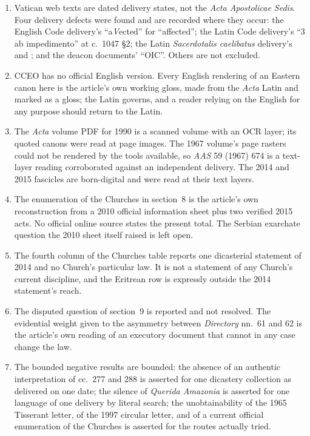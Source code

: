 \begin{enumerate}[leftmargin=1.45em,itemsep=0.25em]
\item Vatican web texts are dated delivery states, not the \emph{Acta Apostolicae Sedis}. Four delivery defects were found and are recorded where they occur: the English Code delivery's ``a\emph{V}ected'' for ``affected''; the Latin Code delivery's ``3 ab impedimento'' at c.~1047 §2; the Latin \emph{Sacerdotalis caelibatus} delivery's  and ; and the deacon documents' ``OIC''. Others are not excluded.
\item CCEO has no official English version. Every English rendering of an Eastern canon here is the article's own working gloss, made from the \emph{Acta} Latin and marked as a gloss; the Latin governs, and a reader relying on the English for any purpose should return to the Latin.
\item The \emph{Acta} volume PDF for 1990 is a scanned volume with an OCR layer; its quoted canons were read at page images. The 1967 volume's page rasters could not be rendered by the tools available, so \emph{AAS} 59 (1967) 674 is a text-layer reading corroborated against an independent delivery. The 2014 and 2015 fascicles are born-digital and were read at their text layers.
\item The enumeration of the Churches  in section~8 is the article's own reconstruction from a 2010 official information sheet plus two verified 2015 acts. No official online source states the present total. The Serbian exarchate question the 2010 sheet itself raised is left open.
\item The fourth column of the Churches table reports one dicasterial statement of 2014 and no Church's particular law. It is not a statement of any Church's current discipline, and the Eritrean row is expressly outside the 2014 statement's reach.
\item The disputed question of section~9 is reported and not resolved. The evidential weight given to the asymmetry between \emph{Directory} nn.~61 and 62 is the article's own reading of an executory document that cannot in any case change the law.
\item The bounded negative results are bounded: the absence of an authentic interpretation of cc.~277 and 288 is asserted for one dicastery collection as delivered on one date; the silence of \emph{Querida Amazonia} is asserted for one language of one delivery by literal search; the unobtainability of the 1965 Tisserant letter, of the 1997 circular letter, and of a current official enumeration of the Churches is asserted for the routes actually tried.

\end{enumerate}
